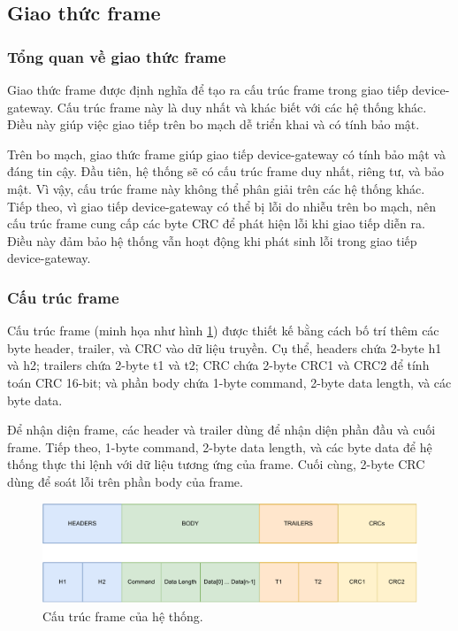 \subsection{Giao thức frame}
\label{Frame-Protocol-subsec}

\subsubsection{Tổng quan về giao thức frame}

Giao thức frame được định nghĩa để tạo ra cấu trúc frame trong giao tiếp device-gateway. Cấu trúc frame này là duy nhất và khác biết với các hệ thống khác. Điều này giúp việc giao tiếp trên bo mạch dễ triển khai và có tính bảo mật.

Trên bo mạch, giao thức frame giúp giao tiếp device-gateway có tính bảo mật và đáng tin cậy. Đầu tiên, hệ thống sẽ có cấu trúc frame duy nhất, riêng tư, và bảo mật. Vì vậy, cấu trúc frame này không thể phân giải trên các hệ thống khác. Tiếp theo, vì giao tiếp device-gateway có thể bị lỗi do nhiễu trên bo mạch, nên cấu trúc frame cung cấp các byte CRC để phát hiện lỗi khi giao tiếp diễn ra. Điều này đảm bảo hệ thống vẫn hoạt động khi phát sinh lỗi trong giao tiếp device-gateway.

\subsubsection{Cấu trúc frame}

Cấu trúc frame (minh họa như hình \ref{fig:Frame-Structure-Overview}) được thiết kế bằng cách bố trí thêm các byte header, trailer, và CRC vào dữ liệu truyền. Cụ thể, headers chứa 2-byte h1 và h2; trailers chứa 2-byte t1 và t2; CRC chứa 2-byte CRC1 và CRC2 để tính toán CRC 16-bit; và phần body chứa 1-byte command, 2-byte data length, và các byte data.

Để nhận diện frame, các header và trailer dùng để nhận diện phần đầu và cuối frame. Tiếp theo, 1-byte command, 2-byte data length, và các byte data để hệ thống thực thi lệnh với dữ liệu tương ứng của frame. Cuối cùng, 2-byte CRC dùng để soát lỗi trên phần body của frame.

\begin{figure}[htp]
\centering
\includegraphics[width=0.9\linewidth]{images/Thesis-Page-4-Frame-Structure-Overview.pdf}
\caption{Cấu trúc frame của hệ thống.}
\label{fig:Frame-Structure-Overview}
\end{figure}

